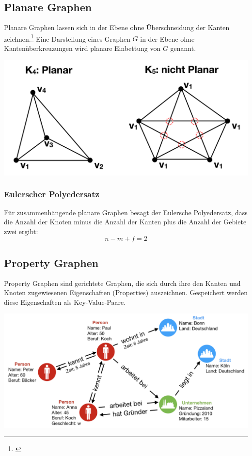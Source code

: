 \subsection{Planare Graphen}
Planare Graphen lassen sich in der Ebene ohne Überschneidung der Kanten zeichnen.\footnote{\cite{Theobald2016}}
Eine Darstellung eines Graphen $G$ in der Ebene ohne Kantenüberkreuzungen wird planare Einbettung von $G$ genannt.

\begin{center}
	\includegraphics[scale = 0.5]{./images/planarer_graph.png}
\end{center}
\subsubsection{Eulerscher Polyedersatz}
Für zusammenhängende planare Graphen besagt der Eulersche Polyedersatz, dass die Anzahl der Knoten minus die Anzahl der Kanten plus die Anzahl der Gebiete zwei ergibt:
\[ n - m + f = 2 \]
\subsection{Property Graphen}
Property Graphen sind gerichtete Graphen, die sich durch ihre den Kanten und Knoten zugewiesenen Eigenschaften (Properties) auszeichnen.
Gespeichert werden diese Eigenschaften als Key-Value-Paare.
\begin{center}
	\includegraphics[scale = 0.65]{./images/Property_graph.png}
\end{center}
